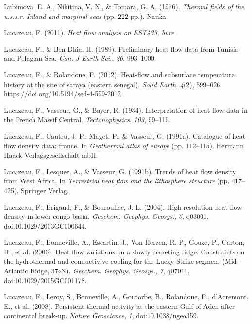 \begin{CSLReferences}{1}{1}
\leavevmode{}%
Lubimova, E. A., Nikitina, V. N., \& Tomara, G. A. (1976). \emph{Thermal fields of the u.s.s.r. Inland and marginal seas} (pp. 222 pp.). Nauka.

\leavevmode{}%
Lucazeau, F. (2011). \emph{Heat flow analysis on EST433, bure}.

\leavevmode{}%
Lucazeau, F., \& Ben Dhia, H. (1989). Preliminary heat flow data from {Tunisia and Pelagian Sea}. \emph{Can. J Earth Sci.}, \emph{26}, 993--1000.

\leavevmode{}%
Lucazeau, F., \& Rolandone, F. (2012). Heat-flow and subsurface temperature history at the site of saraya (eastern senegal). \emph{Solid Earth}, \emph{4}(2), 599--626. \url{https://doi.org/10.5194/sed-4-599-2012}

\leavevmode{}%
Lucazeau, F., Vasseur, G., \& Bayer, R. (1984). Interpretation of heat flow data in the {French Massif Central}. \emph{Tectonophysics}, \emph{103}, 99--119.

\leavevmode{}%
Lucazeau, F., Cautru, J. P., Maget, P., \& Vasseur, G. (1991a). Catalogue of heat flow density data: france. In \emph{Geothermal atlas of europe} (pp. 112--115). Hermann Haack Verlagsgesellschaft mbH.

\leavevmode{}%
Lucazeau, F., Lesquer, A., \& Vasseur, G. (1991b). Trends of heat flow density from {West Africa}. In \emph{Terrestrial heat flow and the lithosphere structure} (pp. 417--425). Springer Verlag.

\leavevmode{}%
Lucazeau, F., Brigaud, F., \& Bouroullec, J. L. (2004). High resolution heat-flow density in lower congo basin. \emph{Geochem. Geophys. Geosys.}, \emph{5}, q03001, doi:10.1029/2003GC000644.

\leavevmode{}%
Lucazeau, F., Bonneville, A., Escartin, J., Von Herzen, R. P., Gouze, P., Carton, H., et al. (2006). Heat flow variations on a slowly accreting ridge: Constraints on the hydrothermal and conductivive cooling for the {Lucky Strike} segment {(Mid-Atlantic Ridge, 37\(\circ\)N)}. \emph{Geochem. Geophys. Geosys.}, \emph{7}, q07011, doi:10.1029/2005GC001178.

\leavevmode{}%
Lucazeau, F., Leroy, S., Bonneville, A., Goutorbe, B., Rolandone, F., d'Acremont, E., et al. (2008). Persistent thermal activity at the eastern {Gulf of Aden} after continental break-up. \emph{Nature Geoscience}, \emph{1}, doi:10.1038/ngeo359.


\end{CSLReferences}
